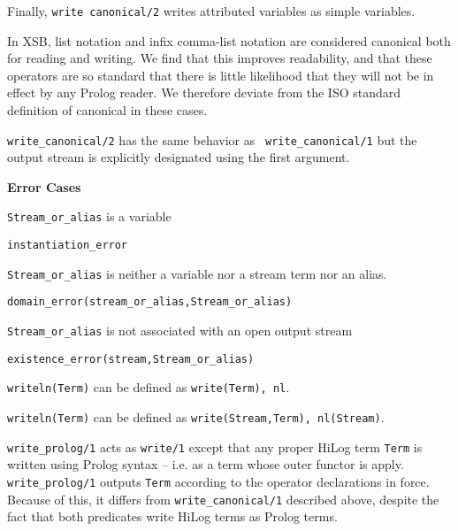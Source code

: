 \begin{description}
Finally, {\tt write canonical/2} writes attributed variables as simple
variables.

\compatability
%
In XSB, list notation and infix comma-list notation are considered
canonical both for reading and writing.  We find that this improves
readability, and that these operators are so standard that there is
little likelihood that they will not be in effect by any Prolog
reader.  We therefore deviate from the ISO standard definition of
canonical in these cases.

%
{\tt write\_canonical/2} has the same behavior as {\tt
write\_canonical/1} but the output stream is explicitly designated
using the first argument.

{\bf Error Cases} 
\bi
\item 	{\tt Stream\_or\_alias} is a variable
\bi
\item {\tt instantiation\_error}
\ei
\item 	{\tt Stream\_or\_alias} is neither a variable nor a stream term nor an alias.
\bi
\item 	{\tt domain\_error(stream\_or\_alias,Stream\_or\_alias)}
\ei
\item 	{\tt Stream\_or\_alias} is not associated with an open output stream
\bi
\item 	{\tt existence\_error(stream,Stream\_or\_alias)}
\ei
\ei

    {\tt writeln(Term)} can be defined as {\tt write(Term), nl}.

    {\tt writeln(Term)} can be defined as {\tt write(Stream,Term),
    nl(Stream)}.


%
   {\tt write\_prolog/1} acts as {\tt write/1} except that any proper
   HiLog term {\tt Term} is written using Prolog syntax -- i.e. as a
   term whose outer functor is apply.  {\tt write\_prolog/1} outputs
   {\tt Term} according to the operator declarations in force.
   Because of this, it differs from {\tt write\_canonical/1} described
   above, despite the fact that both predicates write HiLog terms as
   Prolog terms.


\end{description}
